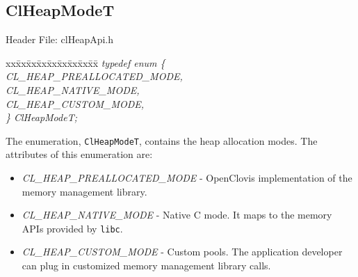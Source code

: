 \begin{flushleft}
\subsection{ClHeapModeT}
\begin{Desc}
\item[Header File:]clHeapApi.h\end{Desc}
\begin{tabbing}
xx\=xx\=xx\=xx\=xx\=xx\=xx\=xx\=xx\=\kill
\textit{typedef enum \{}\\
\>\>\>\>\textit{CL\_HEAP\_PREALLOCATED\_MODE,}\\
\>\>\>\>\textit{CL\_HEAP\_NATIVE\_MODE,}\\
\>\>\>\>\textit{CL\_HEAP\_CUSTOM\_MODE,}\\
\textit{\} ClHeapModeT;}\end{tabbing}
The enumeration, {\tt{ClHeapModeT}}, contains the heap allocation modes. The attributes of this enumeration are:
\begin{itemize}
\item
\textit{CL\_\-HEAP\_\-PREALLOCATED\_\-MODE} - OpenClovis implementation of the memory management library.
\item
\textit{CL\_\-HEAP\_\-NATIVE\_\-MODE} - Native C mode. It maps to the memory APIs provided by {\tt{libc}}.
\item
\textit{CL\_\-HEAP\_\-CUSTOM\_\-MODE} - Custom pools. The application developer can plug in customized memory management library calls.
\end{itemize}





\end{flushleft}
